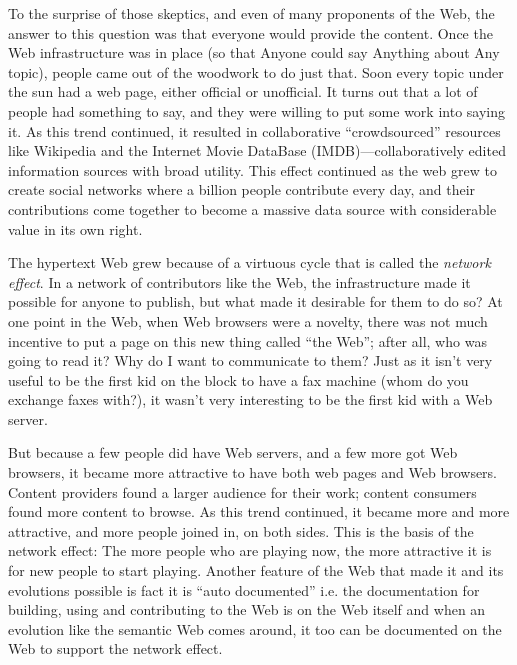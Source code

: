 To the surprise of those skeptics, and even of many proponents of the
Web, the answer to this question was that everyone would provide the
content. Once the Web infrastructure was in place (so that Anyone could
say Anything about Any topic), people came out of the woodwork to do
just that. Soon every topic under the sun had a web page, either
official or unofficial. It turns out that a lot of people had something
to say, and they were willing to put some work into saying it. As this
trend continued, it resulted in collaborative ``crowdsourced'' resources
like Wikipedia and the Internet Movie DataBase (IMDB)---collaboratively
edited information sources with broad utility. This effect continued as
the web grew to create social networks where a billion people contribute
every day, and their contributions come together to become a massive
data source with considerable value in its own right.

The hypertext Web grew because of a virtuous cycle that is called the
\emph{network effect}. In a network of contributors like the Web, the
infrastructure made it possible for anyone to publish, but what made it
desirable for them to do so? At one point in the Web, when Web browsers
were a novelty, there was not much incentive to put a page on this new
thing called ``the Web''; after all, who was going to read it? Why do I
want to communicate to them? Just as it isn't very useful to be the
first kid on the block to have a fax machine (whom do you exchange faxes
with?), it wasn't very interesting to be the first kid with a Web
server.

But because a few people did have Web servers, and a few more got Web
browsers, it became more attractive to have both web pages and Web
browsers. Content providers found a larger audience for their work;
content consumers found more content to browse. As this trend continued,
it became more and more attractive, and more people joined in, on both
sides. This is the basis of the network effect: The more people who are
playing now, the more attractive it is for new people to start playing.
Another feature of the Web that made it and its evolutions possible is
fact it is ``auto documented'' i.e. the documentation for building,
using and contributing to the Web is on the Web itself and when an
evolution like the semantic Web comes around, it too can be documented
on the Web to support the network effect.

